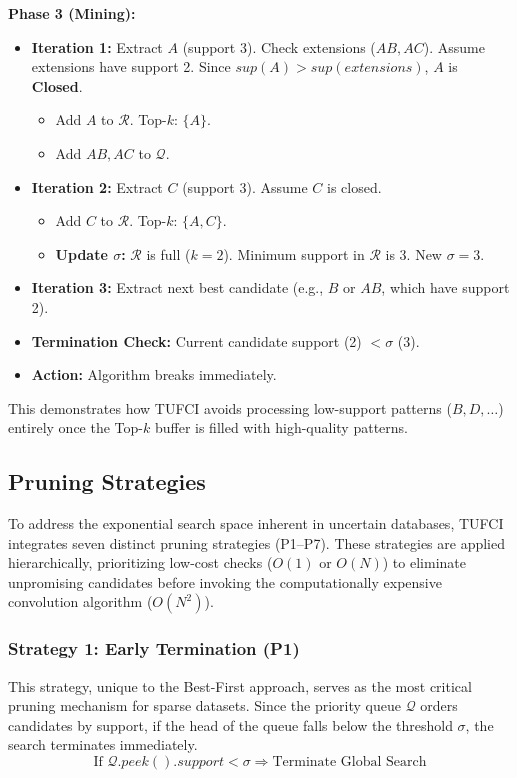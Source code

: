 \documentclass[10pt,letterpaper]{article}
\begin{document}
\textbf{Phase 3 (Mining):}
\begin{itemize}
    \item \textbf{Iteration 1:} Extract $A$ (support 3). Check extensions ($AB, AC$). Assume extensions have support 2. Since $sup(A) > sup(extensions)$, $A$ is \textbf{Closed}. 
    \begin{itemize}
        \item Add $A$ to $\mathcal{R}$. Top-$k$: $\{A\}$.
        \item Add $AB, AC$ to $\mathcal{Q}$.
    \end{itemize}
    \item \textbf{Iteration 2:} Extract $C$ (support 3). Assume $C$ is closed.
    \begin{itemize}
        \item Add $C$ to $\mathcal{R}$. Top-$k$: $\{A, C\}$.
        \item \textbf{Update $\sigma$:} $\mathcal{R}$ is full ($k=2$). Minimum support in $\mathcal{R}$ is 3. New $\sigma = 3$.
    \end{itemize}
    \item \textbf{Iteration 3:} Extract next best candidate (e.g., $B$ or $AB$, which have support 2).
    \item \textbf{Termination Check:} Current candidate support (2) $< \sigma$ (3). 
    \item \textbf{Action:} Algorithm breaks immediately.
\end{itemize}
This demonstrates how TUFCI avoids processing low-support patterns ($B, D, \dots$) entirely once the Top-$k$ buffer is filled with high-quality patterns.


\subsection*{Pruning Strategies}
\label{subsec:pruning}

To address the exponential search space inherent in uncertain databases, TUFCI integrates seven distinct pruning strategies (P1–P7). These strategies are applied hierarchically, prioritizing low-cost checks ($O(1)$ or $O(N)$) to eliminate unpromising candidates before invoking the computationally expensive convolution algorithm ($O(N^2)$).

\subsubsection*{Strategy 1: Early Termination (P1)}
This strategy, unique to the Best-First approach, serves as the most critical pruning mechanism for sparse datasets. Since the priority queue $\mathcal{Q}$ orders candidates by support, if the head of the queue falls below the threshold $\sigma$, the search terminates immediately.
\begin{equation}
\text{If } \mathcal{Q}.\mathit{peek}().support < \sigma \Rightarrow \text{Terminate Global Search}
\end{equation}
\end{document}
